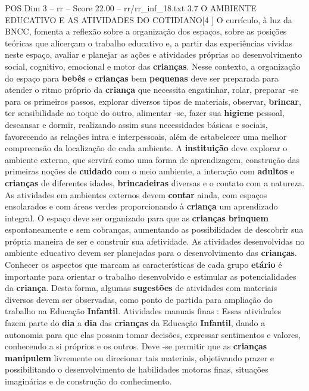 \begin{textsample}{POS Dim 3 – rr – Score 22.00 – rr/rr\_inf\_18.txt}  \label{ex:f3_pos_222}
3.7 O AMBIENTE EDUCATIVO E AS ATIVIDADES DO COTIDIANO[4 ] O currículo, à luz da BNCC, fomenta a reflexão sobre a organização dos espaços, sobre as posições teóricas que alicerçam o trabalho educativo e, a partir das experiências vividas neste espaço, avaliar e planejar as ações e atividades próprias ao desenvolvimento social, cognitivo, emocional e motor das \textbf{crianças}.
Nesse contexto, a organização do espaço para \textbf{bebês} e \textbf{crianças} bem \textbf{pequenas} deve ser preparada para atender o ritmo próprio da \textbf{criança} que necessita engatinhar, rolar, preparar -se para os primeiros passos, explorar diversos tipos de materiais, observar, \textbf{brincar}, ter sensibilidade ao toque do outro, alimentar -se, fazer sua \textbf{higiene} pessoal, descansar e dormir, realizando assim suas necessidades básicas e sociais, favorecendo as relações intra e interpessoais, além de estabelecer uma melhor compreensão da localização de cada ambiente.
A \textbf{instituição} deve explorar o ambiente externo, que servirá como uma forma de aprendizagem, construção das primeiras noções de \textbf{cuidado} com o meio ambiente, a interação com \textbf{adultos} e \textbf{crianças} de diferentes idades, \textbf{brincadeiras} diversas e o contato com a natureza.
As atividades em ambientes externos devem \textbf{contar} ainda, com espaços ensolarados e com áreas verdes proporcionando à \textbf{criança} um aprendizado integral.
O espaço deve ser organizado para que as \textbf{crianças} \textbf{brinquem} espontaneamente e sem cobranças, aumentando as possibilidades de descobrir sua própria maneira de ser e construir sua afetividade.
As atividades desenvolvidas no ambiente educativo devem ser planejadas para o desenvolvimento das \textbf{crianças}.
Conhecer os aspectos que marcam as características de cada grupo \textbf{etário} é importante para orientar o trabalho desenvolvido e estimular as potencialidades da \textbf{criança}.
Desta forma, algumas \textbf{sugestões} de atividades com materiais diversos devem ser observadas, como ponto de partida para ampliação do trabalho na Educação \textbf{Infantil}.
Atividades manuais finas : Essas atividades fazem parte do \textbf{dia} a \textbf{dia} das \textbf{crianças} da Educação \textbf{Infantil}, dando a autonomia para que elas possam tomar decisões, expressar sentimentos e valores, conhecendo a si próprios e os outros.
Deve -se permitir que as \textbf{crianças} \textbf{manipulem} livremente ou direcionar tais materiais, objetivando prazer e possibilitando o desenvolvimento de habilidades motoras finas, situações imaginárias e de construção do conhecimento.

\end{textsample}
